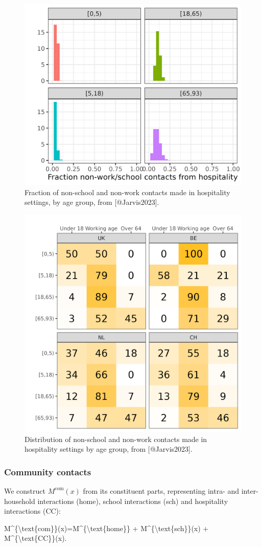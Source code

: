 \documentclass[
]{article}
\newenvironment{Shaded}{\begin{snugshade}}{\end{snugshade}}
\newcommand{\NormalTok}[1]{#1}
\begin{document}
\begin{figure}
\includegraphics[width=0.5\linewidth]{README_files/figure-gfm/hospfrac} \caption{Fraction of non-school and non-work contacts made in hospitality settings, by age group, from [@Jarvis2023].}\label{fig:hospfrac}
\end{figure}

\begin{figure}
\includegraphics[width=0.5\linewidth]{README_files/figure-gfm/conagefrac} \caption{Distribution of non-school and non-work contacts made in hospitality settings by age group, from [@Jarvis2023].}\label{fig:conagefrac}
\end{figure}

\subsubsection{Community contacts}\label{community-contacts}

We construct \(M^{\text{com}}(x)\) from its constituent parts, representing intra- and inter-household interactions (home), school interactions (sch) and hospitality interactions (CC):

\begin{Shaded}
\begin{Highlighting}[]
\NormalTok{M\^{}\{\textbackslash{}text\{com\}\}(x)=M\^{}\{\textbackslash{}text\{home\}\} + M\^{}\{\textbackslash{}text\{sch\}\}(x) + M\^{}\{\textbackslash{}text\{CC\}\}(x).}
\end{Highlighting}
\end{Shaded}
\end{document}

